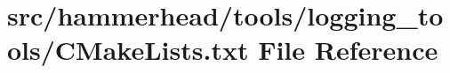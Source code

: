 \hypertarget{tools_2logging__tools_2CMakeLists_8txt}{}\section{src/hammerhead/tools/logging\+\_\+tools/\+C\+Make\+Lists.txt File Reference}
\label{tools_2logging__tools_2CMakeLists_8txt}
